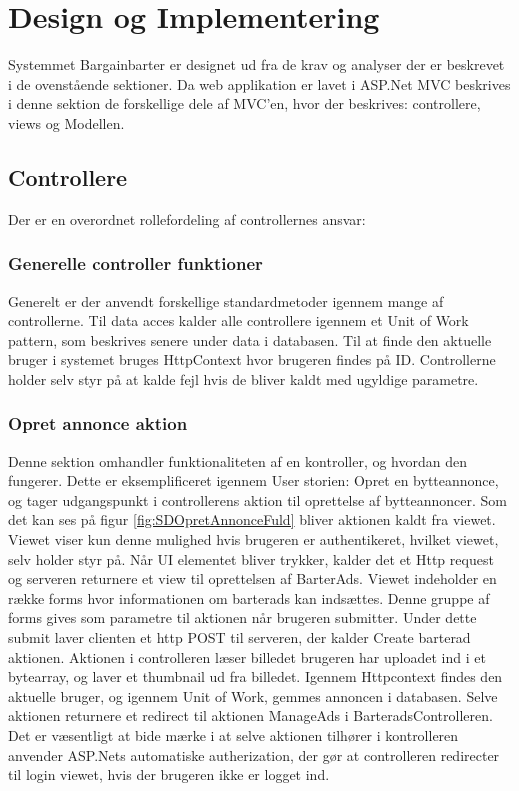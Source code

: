 \chapter{Design og Implementering}
Systemmet Bargainbarter er designet ud fra de krav og analyser der er beskrevet i de ovenstående sektioner. Da web applikation er lavet i ASP.Net MVC beskrives i denne sektion de forskellige dele af MVC'en, hvor der beskrives: controllere, views og Modellen. 


\section{Controllere}
Der er en overordnet rollefordeling af controllernes ansvar: 



\subsection{Generelle controller funktioner}\label{sc:GenerelControl}

Generelt er der anvendt forskellige standardmetoder igennem mange af controllerne. Til data acces kalder alle controllere igennem et Unit of Work pattern, som beskrives senere under data i databasen. Til at finde den aktuelle bruger i systemet bruges HttpContext hvor brugeren findes på ID. Controllerne holder selv styr på at kalde fejl hvis de bliver kaldt med ugyldige parametre.

\subsection{Opret annonce aktion}
Denne sektion omhandler funktionaliteten af en kontroller, og hvordan den fungerer. Dette er eksemplificeret igennem User storien: Opret en bytteannonce, og tager udgangspunkt i controllerens aktion til oprettelse af bytteannoncer.
Som det kan ses på figur \ref{fig:SDOpretAnnonceFuld} bliver aktionen kaldt fra viewet. Viewet viser kun denne mulighed hvis brugeren er authentikeret, hvilket viewet, selv holder styr på. Når UI elementet bliver trykker, kalder det et Http request og serveren returnere et view til oprettelsen af BarterAds. Viewet indeholder en række forms hvor informationen om barterads kan indsættes. Denne gruppe af forms gives som parametre til aktionen når brugeren submitter. Under dette submit laver clienten et http POST til serveren, der kalder Create barterad aktionen. Aktionen i controlleren læser billedet brugeren har uploadet ind i et bytearray, og laver et thumbnail ud fra billedet. Igennem Httpcontext findes den aktuelle bruger, og igennem Unit of Work, gemmes annoncen i databasen. Selve aktionen returnere et redirect til aktionen ManageAds i BarteradsControlleren. Det er væsentligt at bide mærke i at selve aktionen tilhører i kontrolleren anvender ASP.Nets automatiske autherization, der gør at controlleren redirecter til login viewet, hvis der brugeren ikke er logget ind.


